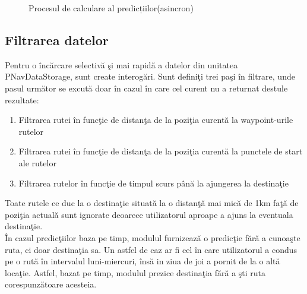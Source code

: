 	\begin{figure}[h!]
   \centering
   \caption{Procesul de calculare al predicțiilor(asincron)}
   \end{figure}	

	\subsection{Filtrarea datelor}
	Pentru o încărcare selectivă şi mai rapidă a datelor din unitatea PNavDataStorage, sunt create interogări. Sunt definiţi trei paşi în filtrare, unde pasul următor se excută doar în cazul în care cel curent nu a returnat destule rezultate:
		\begin{enumerate}
				 \setlength\itemsep{0em}
					\item Filtrarea rutei în funcţie de distanţa de la poziţia curentă la waypoint-urile rutelor
					\item Filtrarea rutei în funcţie de distanţa de la poziţia curentă la punctele de start ale rutelor
					\item Filtrarea rutelor în funcţie de timpul scurs până la ajungerea la destinaţie
		\end{enumerate}

	Toate rutele ce duc la o destinaţie situată la o distanţă mai mică de 1km faţă de poziţia actuală sunt ignorate deoarece utilizatorul aproape a ajuns la eventuala destinaţie.
	\vspace{6pt}
	\\În cazul predicţiilor baza pe timp, modulul furnizează o predicţie fără a cunoaşte ruta, ci doar destinaţia sa. Un astfel de caz ar fi cel în care utilizatorul a condus pe o rută în intervalul luni-miercuri, însă in ziua de joi a pornit de la o altă locaţie. Astfel, bazat pe timp, modulul prezice destinaţia fără a şti ruta corespunzătoare acesteia.
	
